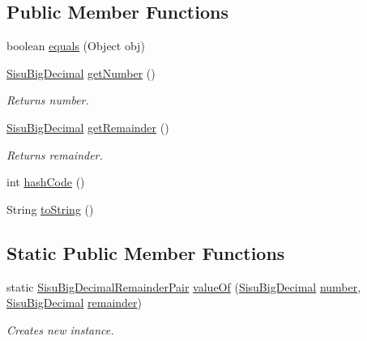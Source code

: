 \subsection*{Public Member Functions}
\begin{DoxyCompactItemize}
\item 
boolean \hyperlink{classcom_1_1aarrelaakso_1_1drawl_1_1_sisu_big_decimal_remainder_pair_a911dcb06263e1bb7b3735b2795a9175f}{equals} (Object obj)
\item 
\hyperlink{classcom_1_1aarrelaakso_1_1drawl_1_1_sisu_big_decimal}{Sisu\+Big\+Decimal} \hyperlink{classcom_1_1aarrelaakso_1_1drawl_1_1_sisu_big_decimal_remainder_pair_ac2d403d156c6b95d3850d72117b9db3d}{get\+Number} ()
\begin{DoxyCompactList}\small\item\em Returns number. \end{DoxyCompactList}\item 
\hyperlink{classcom_1_1aarrelaakso_1_1drawl_1_1_sisu_big_decimal}{Sisu\+Big\+Decimal} \hyperlink{classcom_1_1aarrelaakso_1_1drawl_1_1_sisu_big_decimal_remainder_pair_a2dea512a765d3ca63baeb155bf5f2312}{get\+Remainder} ()
\begin{DoxyCompactList}\small\item\em Returns remainder. \end{DoxyCompactList}\item 
int \hyperlink{classcom_1_1aarrelaakso_1_1drawl_1_1_sisu_big_decimal_remainder_pair_a976651dc605ac114b1b8aac330d420ab}{hash\+Code} ()
\item 
String \hyperlink{classcom_1_1aarrelaakso_1_1drawl_1_1_sisu_big_decimal_remainder_pair_ac28afa59d19508fdbf2c1889c9fcd05e}{to\+String} ()
\end{DoxyCompactItemize}
\subsection*{Static Public Member Functions}
\begin{DoxyCompactItemize}
\item 
static \hyperlink{classcom_1_1aarrelaakso_1_1drawl_1_1_sisu_big_decimal_remainder_pair}{Sisu\+Big\+Decimal\+Remainder\+Pair} \hyperlink{classcom_1_1aarrelaakso_1_1drawl_1_1_sisu_big_decimal_remainder_pair_ad23fce014bb13131e936ebbbbc33c9b2}{value\+Of} (\hyperlink{classcom_1_1aarrelaakso_1_1drawl_1_1_sisu_big_decimal}{Sisu\+Big\+Decimal} \hyperlink{classcom_1_1aarrelaakso_1_1drawl_1_1_sisu_big_decimal_remainder_pair_aa9a5427a9e385635c8926422a430dcdd}{number}, \hyperlink{classcom_1_1aarrelaakso_1_1drawl_1_1_sisu_big_decimal}{Sisu\+Big\+Decimal} \hyperlink{classcom_1_1aarrelaakso_1_1drawl_1_1_sisu_big_decimal_remainder_pair_aa67b06e15115b1930dae9de0aa8e039f}{remainder})
\begin{DoxyCompactList}\small\item\em Creates new instance. \end{DoxyCompactList}\end{DoxyCompactItemize}
